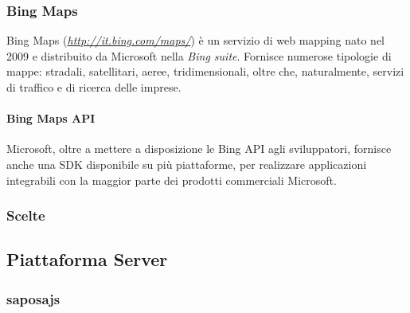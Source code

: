 \subsubsection{Bing Maps}
Bing Maps (\emph{\url{http://it.bing.com/maps/}}) è un servizio di web mapping nato nel 2009 e distribuito da Microsoft nella \textit{Bing suite}.
Fornisce numerose tipologie di mappe: stradali, satellitari, aeree, tridimensionali, oltre che, naturalmente, servizi di traffico e di ricerca delle imprese.
\paragraph{Bing Maps API}
Microsoft, oltre a mettere a disposizione le Bing API agli sviluppatori, fornisce anche una SDK disponibile su più piattaforme, per realizzare applicazioni integrabili con la maggior parte dei prodotti commerciali Microsoft.
\subsubsection{Scelte}

\subsection{Piattaforma Server}
\subsubsection{saposajs}

